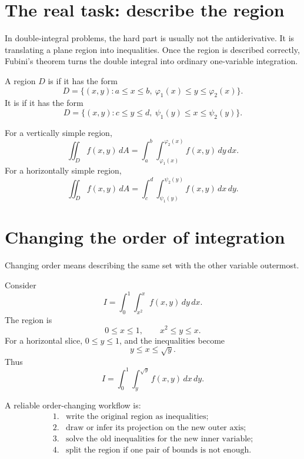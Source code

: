 
\section{The real task: describe the region}

In double-integral problems, the hard part is usually not the antiderivative.  It is translating a plane region into inequalities.  Once the region is described correctly, Fubini's theorem turns the double integral into ordinary one-variable integration.

\begin{definition}
A region \(D\) is  if it has the form
\[
  D=\{(x,y):a\le x\le b,\ \varphi_1(x)\le y\le \varphi_2(x)\}.
\]
It is  if it has the form
\[
  D=\{(x,y):c\le y\le d,\ \psi_1(y)\le x\le \psi_2(y)\}.
\]
\end{definition}

For a vertically simple region,
\[
  \iint_D f(x,y)\,dA
  =\int_a^b\int_{\varphi_1(x)}^{\varphi_2(x)}f(x,y)\,dy\,dx.
\]
For a horizontally simple region,
\[
  \iint_D f(x,y)\,dA
  =\int_c^d\int_{\psi_1(y)}^{\psi_2(y)}f(x,y)\,dx\,dy.
\]

\section{Changing the order of integration}

Changing order means describing the same set with the other variable outermost.

\begin{example}
Consider
\[
  I=\int_0^1\int_{x^2}^{x} f(x,y)\,dy\,dx.
\]
The region is
\[
  0\le x\le1,\qquad x^2\le y\le x.
\]
For a horizontal slice, \(0\le y\le1\), and the inequalities become
\[
  y\le x\le \sqrt y.
\]
Thus
\[
  I=\int_0^1\int_y^{\sqrt y}f(x,y)\,dx\,dy.
\]
\end{example}

A reliable order-changing workflow is:
\[
\begin{array}{ll}
1. & \text{write the original region as inequalities;}\\
2. & \text{draw or infer its projection on the new outer axis;}\\
3. & \text{solve the old inequalities for the new inner variable;}\\
4. & \text{split the region if one pair of bounds is not enough.}
\end{array}
\]

